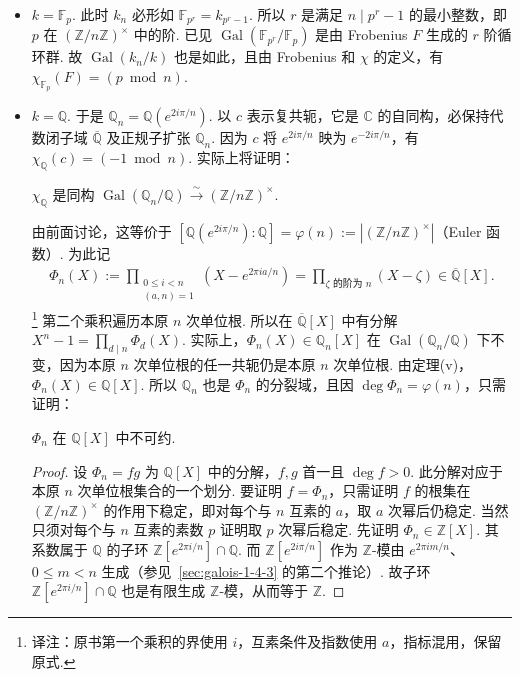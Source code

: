 \begin{itemize}
\item $k=\mathbb F_p$. 此时 $k_n$ 必形如 $\mathbb F_{p^r}=k_{p^r-1}$. 所以 $r$ 是满足 $n\mid p^r-1$ 的最小整数，即 $p$ 在 $(\mathbb Z/n\mathbb Z)^\times$ 中的阶. 已见 $\operatorname{Gal}(\mathbb F_{p^r}/\mathbb F_p)$ 是由 Frobenius $F$ 生成的 $r$ 阶循环群. 故 $\operatorname{Gal}(k_n/k)$ 也是如此，且由 Frobenius 和 $\chi$ 的定义，有 $\chi_{\mathbb F_p}(F)=(p\bmod n)$.
\item $k=\mathbb Q$. 于是 $\mathbb Q_n=\mathbb Q(e^{2i\pi/n})$. 以 $c$ 表示复共轭，它是 $\mathbb C$ 的自同构，必保持代数闭子域 $\overline{\mathbb Q}$ 及正规子扩张 $\mathbb Q_n$. 因为 $c$ 将 $e^{2i\pi/n}$ 映为 $e^{-2i\pi/n}$，有 $\chi_{\mathbb Q}(c)=(-1\bmod n)$. 实际上将证明：
\begin{theorem*}$\chi_{\mathbb Q}$ 是同构 $\operatorname{Gal}(\mathbb Q_n/\mathbb Q)\xrightarrow{\sim}(\mathbb Z/n\mathbb Z)^\times$.\end{theorem*}
由前面讨论，这等价于 $[\mathbb Q(e^{2i\pi/n}):\mathbb Q]=\varphi(n):=|(\mathbb Z/n\mathbb Z)^\times|$（Euler 函数）. 为此记
\begin{align*}
\Phi_n(X):=\prod_{\substack{0\leq i<n\\(a,n)=1}}(X-e^{2\pi ia/n})=\prod_{\zeta\text{ 的阶为 }n}(X-\zeta)\in\overline{\mathbb Q}[X].
\end{align*}
\footnote{译注：原书第一个乘积的界使用 $i$，互素条件及指数使用 $a$，指标混用，保留原式.}
第二个乘积遍历本原 $n$ 次单位根. 所以在 $\overline{\mathbb Q}[X]$ 中有分解 $X^n-1=\prod_{d\mid n}\Phi_d(X)$. 实际上，$\Phi_n(X)\in\mathbb Q_n[X]$ 在 $\operatorname{Gal}(\mathbb Q_n/\mathbb Q)$ 下不变，因为本原 $n$ 次单位根的任一共轭仍是本原 $n$ 次单位根. 由定理(v)，$\Phi_n(X)\in\mathbb Q[X]$. 所以 $\mathbb Q_n$ 也是 $\Phi_n$ 的分裂域，且因 $\deg\Phi_n=\varphi(n)$，只需证明：
\begin{lemma*}$\Phi_n$ 在 $\mathbb Q[X]$ 中不可约.\end{lemma*}
\begin{proof}设 $\Phi_n=fg$ 为 $\mathbb Q[X]$ 中的分解，$f,g$ 首一且 $\deg f>0$. 此分解对应于本原 $n$ 次单位根集合的一个划分. 要证明 $f=\Phi_n$，只需证明 $f$ 的根集在 $(\mathbb Z/n\mathbb Z)^\times$ 的作用下稳定，即对每个与 $n$ 互素的 $a$，取 $a$ 次幂后仍稳定. 当然只须对每个与 $n$ 互素的素数 $p$ 证明取 $p$ 次幂后稳定.
先证明 $\Phi_n\in\mathbb Z[X]$. 其系数属于 $\mathbb Q$ 的子环 $\mathbb Z[e^{2\pi i/n}]\cap\mathbb Q$. 而 $\mathbb Z[e^{2i\pi/n}]$ 作为 $\mathbb Z$-模由 $e^{2\pi im/n}$、$0\leq m<n$ 生成（参见~\ref{sec:galois-1-4-3} 的第二个推论）. 故子环 $\mathbb Z[e^{2\pi i/n}]\cap\mathbb Q$ 也是有限生成 $\mathbb Z$-模，从而等于 $\mathbb Z$.

\end{proof}
\end{itemize}
